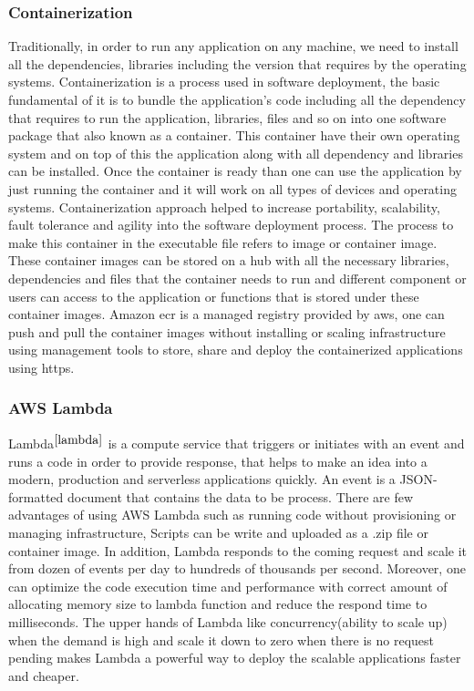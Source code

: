 \subsubsection{Containerization}
Traditionally, in order to run any application on any machine, we need to install all the dependencies, libraries including the version that requires by the operating systems. Containerization is a process used in software deployment, the basic fundamental of it is to bundle the application's code including all the dependency that requires to run the application, libraries, files and so on into one software package that also known as a container. This container have their own operating system and on top of this the application along with all dependency and libraries can be installed. Once the container is ready than one can use the application by just running the container and it will work on all types of devices and operating systems. Containerization approach helped to increase portability, scalability, fault tolerance and agility into the software deployment process. The process to make this container in the executable file refers to image or container image. These container images can be stored on a hub with all the necessary libraries, dependencies and files that the container needs to run and different component or users can access to the application or functions that is stored under these container images. Amazon \acrfull{ecr} is a managed registry provided by aws, one can push and pull the container images without installing or scaling infrastructure using management tools to store, share and deploy the containerized applications using \acrfull{https}. 

\subsubsection{AWS Lambda}
Lambda\(^{\ref{lambda}}\) is a compute service that triggers or initiates with an event and runs a code in order to provide response, that helps to make an idea into a modern, production and serverless applications quickly.  An event is a JSON-formatted document that contains the data to be process. There are few advantages of using AWS Lambda such as running code without provisioning or managing infrastructure, Scripts can be write and uploaded as a .zip file or container image. In addition, Lambda responds to the coming request and scale it from dozen of events per day to hundreds of thousands per second. Moreover, one can optimize the code execution time and performance with correct amount of allocating memory size to lambda function and reduce the respond time to milliseconds. The upper hands of Lambda like concurrency(ability to scale up) when the demand is high and scale it down to zero when there is no request pending makes Lambda a powerful way to deploy the scalable applications faster and cheaper. 

